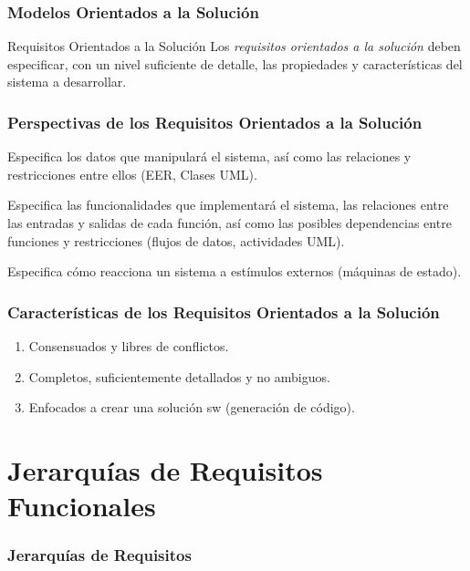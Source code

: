 \documentclass[slidestop,xcolor=pst,dvips,blue]{beamer}
\begin{document}
\begin{frame}[c]
    \frametitle{Modelos Orientados a la Solución}
    \begin{block}{Requisitos Orientados a la Solución}
        Los \emph{requisitos orientados a la solución} deben especificar, con un nivel suficiente de detalle, las propiedades y características del sistema a desarrollar.
    \end{block}
\end{frame}

\begin{frame}[c]
    \frametitle{Perspectivas de los Requisitos Orientados a la Solución}
    \begin{description}[<+->]
        \item[Datos] Especifica los datos que manipulará el sistema, así como las relaciones y restricciones entre ellos (EER, Clases UML).
        \item[Funcional] Especifica las funcionalidades que implementará el sistema, las relaciones entre las entradas y salidas de cada función, así como las posibles dependencias entre funciones y restricciones (flujos de datos, actividades UML).
        \item[Comportamiento] Especifica cómo reacciona un sistema a estímulos externos (máquinas de estado).
    \end{description}
\end{frame}

\begin{frame}[c]
    \frametitle{Características de los Requisitos Orientados a la Solución}
    \begin{enumerate}[<+->]
        \item Consensuados y libres de conflictos.
        \item Completos, suficientemente detallados y no ambiguos.
        \item Enfocados a crear una solución sw (generación de código).
    \end{enumerate}
\end{frame}

\section{Jerarquías de Requisitos Funcionales}

\begin{frame}
    \frametitle{Jerarquías de Requisitos}
\end{frame}
\end{document}

